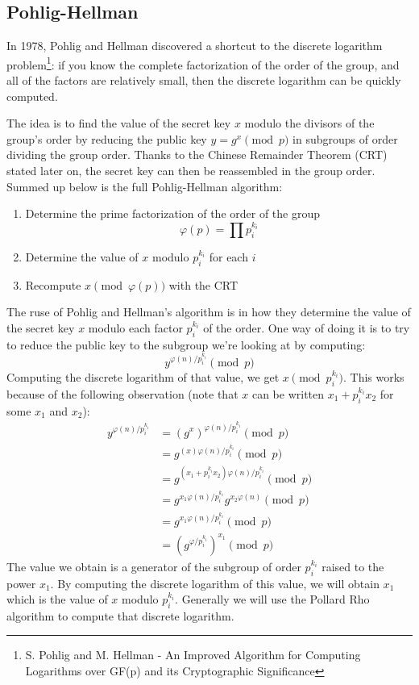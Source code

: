 \documentclass[a4paper,11pt,twocolumn]{article}
\begin{document}
\subsection{Pohlig-Hellman}

In 1978, Pohlig and Hellman discovered a shortcut to the discrete logarithm problem\footnote{S. Pohlig and M. Hellman - An Improved Algorithm for Computing Logarithms over GF(p) and its Cryptographic Significance}\cite{PH}: if you know the complete factorization of the order of the group, and all of the factors are relatively small, then the discrete logarithm can be quickly computed.

The idea is to find the value of the secret key $x$ modulo the divisors of the group's order by reducing the public key $y = g^x \pmod{p}$ in subgroups of order dividing the group order. Thanks to the Chinese Remainder Theorem (CRT) stated later on, the secret key can then be reassembled in the group order. Summed up below is the full Pohlig-Hellman algorithm:

\begin{enumerate}
    \item Determine the prime factorization of the order of the group
        $$\varphi(p) = \prod p_i^{k_i} $$
    \item Determine the value of $x$ modulo $p_i^{k_i}$ for each $i$
    \item Recompute $x \pmod{\varphi(p)}$ with the CRT
\end{enumerate}

The ruse of Pohlig and Hellman's algorithm is in how they determine the value of the secret key $x$ modulo each factor $p_i^{k_i}$ of the order. One way of doing it is to try to reduce the public key to the subgroup we're looking at by computing:
$$y^{\varphi(n)/p_i^{k_i}} \pmod{p}$$
Computing the discrete logarithm of that value, we get $x \pmod{p_i^{k_i}}$. This works because of the following observation (note that $x$ can be written $x_1 + p_i^{k_i} x_2$ for some $x_1$ and $x_2$):
\begin{align*}
    y^{\varphi(n)/p_i^{k_i}} &= (g^{x})^{\varphi(n)/p_i^{k_i}} \pmod{p}\\
    &= g^{(x) \varphi(n)/p_i^{k_i}} \pmod{p}\\
    &= g^{(x_1 + p_i^{k_i} x_2) \varphi(n)/p_i^{k_i}} \pmod{p}\\
    &= g^{x_1 \varphi(n)/p_i^{k_i}} g^{x_2 \varphi(n)} \pmod{p}\\
    &= g^{x_1 \varphi(n)/p_i^{k_i}} \pmod{p}\\
    &= (g^{\varphi/p_i^{k_i}})^{x_1} \pmod{p}
\end{align*}
The value we obtain is a generator of the subgroup of order $p_i^{k_i}$ raised to the power $x_1$. By computing the discrete logarithm of this value, we will obtain $x_1$ which is the value of $x$ modulo $p_i^{k_i}$. Generally we will use the Pollard Rho algorithm to compute that discrete logarithm.\\
\end{document}

